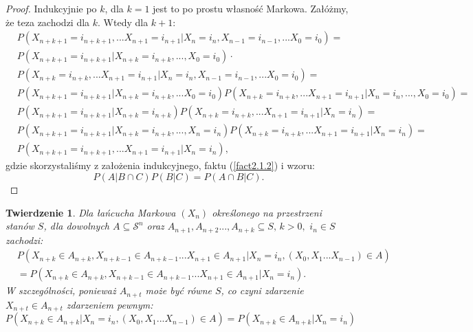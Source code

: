 \documentclass[a4paper]{article}
\theoremstyle{defn}
\theoremstyle{theorem}
\newtheorem{theorem}[defn]{Twierdzenie}
\theoremstyle{lemma}
\theoremstyle{cor}
\theoremstyle{fact}
\begin{document}
\begin{proof}
Indukcyjnie po $k$, dla $k = 1$ jest to po prostu własność Markowa. Załóżmy, że teza zachodzi dla $k$. Wtedy dla $k+1$:
\begin{align*}
    &P(X_{n+k+1} = i_{n+k+1}, ...X_{n+1} = i_{n+1} | X_n = i_n, X_{n-1} = i_{n-1}, ... X_0 = i_0) = \\
    &P(X_{n+k+1} = i_{n+k+1}|X_{n+k} = i_{n+k}, ..., X_0 = i_0) \cdot\\
    &P(X_{n+k} = i_{n+k}, ...X_{n+1} = i_{n+1} | X_n = i_n, X_{n-1} = i_{n-1}, ... X_0 = i_0) = \\
    & P(X_{n+k+1} = i_{n+k+1}|X_{n+k} = i_{n+k}, ... X_0 = i_0)P(X_{n+k} = i_{n+k}, ...X_{n+1} = i_{n+1} | X_n = i_n, ..., X_0=i_0) =\\
    & P(X_{n+k+1} = i_{n+k+1}|X_{n+k} = i_{n+k})P(X_{n+k} = i_{n+k}, ...X_{n+1} = i_{n+1} | X_n = i_n) =\\
    & P(X_{n+k+1} = i_{n+k+1}|X_{n+k} = i_{n+k}, ..., X_n=i_n)P(X_{n+k} = i_{n+k}, ...X_{n+1} = i_{n+1} | X_n = i_n) =\\
    & P(X_{n+k+1} = i_{n+k+1}, ...X_{n+1} = i_{n+1}| X_n = i_n),
\end{align*}
gdzie skorzystaliśmy z założenia indukcyjnego, faktu (\ref{fact2.1.2}) i wzoru: $$P(A| B \cap C)P(B|C) = P(A \cap B |C).$$
\end{proof}
\begin{theorem}\label{theorem2.1.4}
Dla łańcucha Markowa $(X_n)$ określonego na przestrzeni stanów $S$, dla dowolnych $A \subseteq \mathcal{S}^n$ oraz $A_{n+1}, A_{n+2}..., A_{n+k} \subseteq S,\, k>0, \,\, i_n \in S$ zachodzi:
\\
\begin{align*}
&P(X_{n+k} \in A_{n+k}, X_{n+k-1} \in A_{n+k-1}...X_{n+1} \in A_{n+1}|X_n = i_n, (X_{0}, X_{1} ... X_{n-1}) \in A)\\
&= P(X_{n+k} \in A_{n+k}, X_{n+k-1} \in A_{n+k-1}...X_{n+1} \in A_{n+1}|X_n = i_n).
\end{align*}
W szczególności, ponieważ $A_{n+t}$ może być równe $S$, co czyni zdarzenie $X_{n+t} \in A_{n+t}$ zdarzeniem pewnym:\\
$$P(X_{n+k} \in A_{n+k}|X_n = i_n, (X_{0}, X_{1} ... X_{n-1}) \in A) = P(X_{n+k} \in A_{n+k}|X_n = i_n)$$
\end{theorem}
\end{document}
